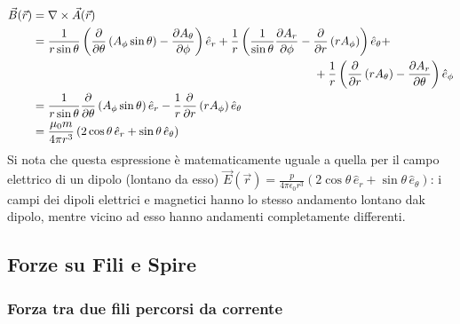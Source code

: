 \documentclass[]{article}
\begin{document}
\begin{equation}
	\begin{split}
		\vec{B}(\vec{r}) &= \nabla\times\vec{A}(\vec{r}) \\
				 &= \displaystyle\frac{1}{r\sin\theta} \left( \displaystyle\frac{\partial}{\partial\theta} \left( A_{\phi} \sin\theta \right) - \displaystyle\frac{\partial A_{\theta}}{\partial\phi} \right) \hat{e}_r + \displaystyle\frac{1}{r} \left( \displaystyle\frac{1}{\sin\theta} \displaystyle\frac{\partial A_r}{\partial\phi} - \displaystyle\frac{\partial}{\partial r} \left(r A_{\phi} \right)\right) \hat{e}_{\theta} + \\ 
				 & \qquad\qquad\qquad\qquad\qquad\qquad\qquad\qquad\qquad\qquad\qquad\qquad + \displaystyle\frac{1}{r} \left(\displaystyle\frac{\partial}{\partial r} \left( r A_{\theta} \right) - \displaystyle\frac{\partial A_r}{\partial\theta} \right) \hat{e}_{\phi} \\ 
				 &= \displaystyle\frac{1}{r\sin\theta}\displaystyle\frac{\partial}{\partial\theta} \left(A_{\phi} \sin\theta\right) \hat{e}_r - \displaystyle\frac{1}{r} \displaystyle\frac{\partial}{\partial r} \left( r A_{\phi} \right) \hat{e}_{\theta} \\ 
				 &= \displaystyle\frac{\mu_0 m}{4\pi r^3} \left(2\cos\theta \,\hat{e}_r + \sin\theta \,\hat{e}_{\theta}\right)
	\end{split}
	\label{eq:}
\end{equation}
Si nota che questa espressione è matematicamente uguale a quella per il campo elettrico di un dipolo (lontano da esso) $ \vec{E}(\vec{r}) = \frac{p}{4\pi\epsilon_0 r^3} \left(2\cos\theta \,\hat{e}_r + \sin\theta \,\hat{e}_{\theta} \right) $: i campi dei dipoli elettrici e magnetici hanno lo stesso andamento lontano dak dipolo, mentre vicino ad esso hanno andamenti completamente differenti.

\subsection{Forze su Fili e Spire}

\subsubsection{Forza tra due fili percorsi da corrente}
\end{document}
